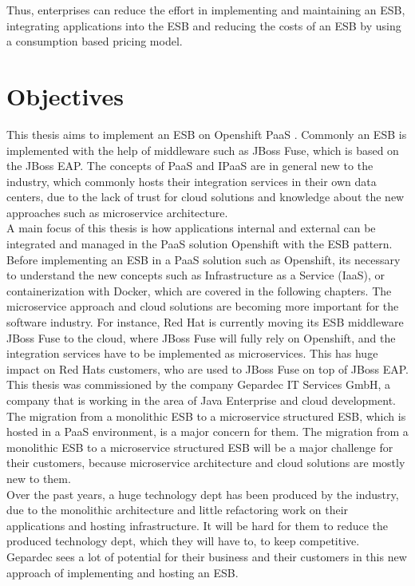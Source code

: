 Thus, enterprises can reduce the effort in implementing and maintaining an ESB, integrating applications into the ESB and reducing the costs of an ESB by using a consumption based pricing model.

\section{Objectives}
\label{sec:intro-objectives}
This thesis aims to implement an ESB on Openshift PaaS \cite{Openshift2018}. Commonly an ESB is implemented with the help of middleware such as JBoss Fuse, which is based on the JBoss EAP. The concepts of PaaS and IPaaS are in general new to the industry, which commonly hosts their integration services in their own data centers, due to the lack of trust for cloud solutions and knowledge about the new approaches such as microservice architecture. \\

A main focus of this thesis is how applications internal and external can be integrated and managed in the PaaS solution Openshift with the ESB pattern. Before implementing an ESB in a PaaS solution such as Openshift, its necessary to understand the new concepts such as Infrastructure as a Service (IaaS), or containerization with Docker, which are covered in the following chapters. The microservice approach and cloud solutions are becoming more important for the software industry. For instance, Red Hat is currently moving its ESB middleware JBoss Fuse to the cloud, where JBoss Fuse will fully rely on Openshift, and the integration services have to be implemented as microservices. This has huge impact on Red Hats customers, who are used to JBoss Fuse on top of JBoss EAP. \\

This thesis was commissioned by the company Gepardec IT Services GmbH, a company that is working in the area of Java Enterprise and cloud development. The migration from a monolithic ESB to a microservice structured ESB, which is hosted in a PaaS environment, is a major concern for them. The migration from a monolithic ESB to a microservice structured ESB will be a major challenge for their customers, because microservice architecture and cloud solutions are mostly new to them. \\

Over the past years, a huge technology dept has been produced by the industry, due to the monolithic architecture and little refactoring work on their applications and hosting infrastructure. It will be hard for them to reduce the produced technology dept, which they will have to, to keep competitive. Gepardec sees a lot of potential for their business and their customers in this new approach of implementing and hosting an ESB.
 



